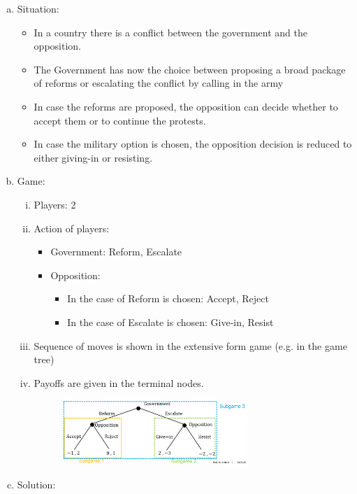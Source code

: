 \begin{enumerate}[a)]
    \item Situation:
        \begin{itemize}
            \item In a country there is a conflict between the government and
                the opposition.
            \item The Government has now the choice between proposing a broad
                package of reforms or escalating the conflict by calling in the
                army
            \item In case the reforms are proposed, the opposition can decide
                whether to accept them or to continue the protests.
            \item In case the military option is chosen, the opposition
                decision is reduced to either giving-in or resisting.
        \end{itemize}
    \item Game:
        \begin{enumerate}[(i)]
            \item Players: 2
            \item Action of players:
                \begin{itemize}
                    \item Government: Reform, Escalate
                    \item Opposition:
                        \begin{itemize}
                            \item In the case of Reform is chosen: Accept, Reject
                            \item In the case of Escalate is chosen: Give-in, Resist
                        \end{itemize}
                \end{itemize}
            \item Sequence of moves is shown in the extensive form game (e.g. in the game tree)
            \item Payoffs are given in the terminal nodes.
            \begin{figure}[H]
                \centering
                \includegraphics[width=0.7\textwidth]{Pictures/political_crisis_example.png}
            \end{figure}
        \end{enumerate}
    \item Solution:
    

\end{enumerate}
